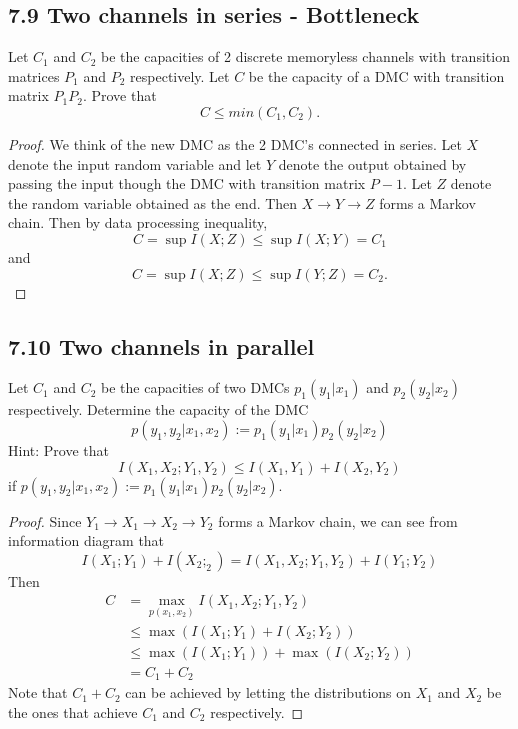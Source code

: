 \documentclass[../main.tex]{subfiles}
\begin{document}
\subsection*{7.9 Two channels in series - Bottleneck}
Let $C_1$ and $C_2$ be the capacities of 2 discrete memoryless channels with transition matrices $P_1$ and $P_2$ respectively. Let $C$ be the capacity of a DMC with transition matrix $P_1P_2$. Prove that \[
C\leq min(C_1, C_2).
\]
\begin{proof}
    We think of the new DMC as the 2 DMC's connected in series. Let $X$ denote the input random variable and let $Y$ denote the output obtained by passing the input though the DMC with transition matrix $P-1$. Let $Z$ denote the random variable obtained as the end. Then $X\to Y\to Z$ forms a Markov chain. Then by data processing inequality,
    \[
    C = \sup I(X;Z) \leq \sup I(X;Y) = C_1
    \] and 
    \[
    C = \sup I(X;Z) \leq \sup I(Y;Z) = C_2.
    \]
\end{proof}

\subsection*{7.10 Two channels in parallel} Let $C_1$ and $C_2$ be the capacities of two DMCs $p_1(y_1|x_1)$ and $p_2(y_2|x_2)$ respectively. Determine the capacity of the DMC \[
p(y_1,y_2|x_1,x_2) := p_1(y_1|x_1)p_2(y_2|x_2)
\] 
Hint: Prove that \[
I(X_1,X_2;Y_1,Y_2)\leq I(X_1,Y_1) + I(X_2,Y_2)
\] if $p(y_1,y_2|x_1,x_2) := p_1(y_1|x_1)p_2(y_2|x_2)$.
\begin{proof}
    Since $Y_1\to X_1\to X_2\to Y_2$ forms a Markov chain, we can see from information diagram that \[
    I(X_1;Y_1) + I(X_2;_2) = I(X_1,X_2;Y_1,Y_2) + I(Y_1;Y_2)
    \]
    Then \begin{align*}
        C &= \max_{p(x_1,x_2)}I(X_1,X_2;Y_1,Y_2)\\
        &\leq \max(I(X_1;Y_1)+I(X_2;Y_2))\\
        &\leq \max(I(X_1;Y_1))+\max(I(X_2;Y_2))\\
        &= C_1+C_2
    \end{align*}
    Note that $C_1+C_2$ can be achieved by letting the distributions on $X_1$ and $X_2$ be the ones that achieve $C_1$ and $C_2$ respectively.
\end{proof}
\end{document}
